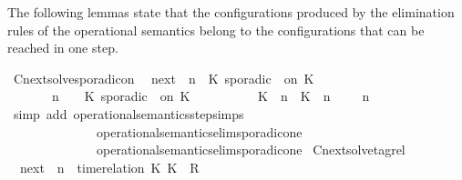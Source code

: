\begin{isabellebody}
\endisatagproof
{\isafoldproof}%
%
\isadelimproof
%
\endisadelimproof
%
\begin{isamarkuptext}%
The following lemmas state that the configurations produced by the elimination 
  rules of the operational semantics belong to the configurations that can be 
  reached in one step.%
\end{isamarkuptext}\isamarkuptrue%
\isamarkupfalse%
\ Cnext{\isacharunderscore}solve{\isacharunderscore}sporadicon{\isacharcolon}\isanewline
\ \ {\isacartoucheopen}{\isacharparenleft}{\isasymC}\isactrlsub n\isactrlsub e\isactrlsub x\isactrlsub t\ {\isacharparenleft}{\isasymGamma}{\isacharcomma}\ n\ {\isasymturnstile}\ {\isacharparenleft}{\isacharparenleft}K\ sporadic\ {\isasymtau}\ on\ K\ {\isacharhash}\ {\isasymPsi}{\isacharparenright}\ {\isasymtriangleright}\ {\isasymPhi}{\isacharparenright}{\isacharparenright}\isanewline
\ \ \ \ {\isasymsupseteq}\ {\isacharbraceleft}\ {\isasymGamma}{\isacharcomma}\ n\ {\isasymturnstile}\ {\isasymPsi}\ {\isasymtriangleright}\ {\isacharparenleft}{\isacharparenleft}K\ sporadic\ {\isasymtau}\ on\ K\ {\isacharhash}\ {\isasymPhi}{\isacharparenright}{\isacharcomma}\isanewline
\ \ \ \ \ \ \ \ {\isacharparenleft}{\isacharparenleft}K\ {\isasymUp}\ n{\isacharparenright}\ {\isacharhash}\ {\isacharparenleft}K\ {\isasymDown}\ n\ {\isacharat}\ {\isasymtau}{\isacharparenright}\ {\isacharhash}\ {\isasymGamma}{\isacharparenright}{\isacharcomma}\ n\ {\isasymturnstile}\ {\isasymPsi}\ {\isasymtriangleright}\ {\isasymPhi}\ {\isacharbraceright}{\isacartoucheclose}\isanewline
%
\isadelimproof
%
\endisadelimproof
%
\isatagproof
{}\isamarkupfalse%
\ {\isacharparenleft}simp\ add{\isacharcolon}\ operational{\isacharunderscore}semantics{\isacharunderscore}step{\isachardot}simps\isanewline
\ \ \ \ \ \ \ \ \ \ \ \ \ \ operational{\isacharunderscore}semantics{\isacharunderscore}elim{\isachardot}sporadic{\isacharunderscore}on{\isacharunderscore}e{}\isanewline
\ \ \ \ \ \ \ \ \ \ \ \ \ \ operational{\isacharunderscore}semantics{\isacharunderscore}elim{\isachardot}sporadic{\isacharunderscore}on{\isacharunderscore}e{}{\isacharparenright}%
\endisatagproof
{\isafoldproof}%
%
\isadelimproof
\isanewline
%
\endisadelimproof
\isanewline
{}\isamarkupfalse%
\ Cnext{\isacharunderscore}solve{\isacharunderscore}tagrel{\isacharcolon}\isanewline
\ \ {\isacartoucheopen}{\isacharparenleft}{\isasymC}\isactrlsub n\isactrlsub e\isactrlsub x\isactrlsub t\ {\isacharparenleft}{\isasymGamma}{\isacharcomma}\ n\ {\isasymturnstile}\ {\isacharparenleft}{\isacharparenleft}time{\isacharminus}relation\ {\isasymlfloor}K\ K\ {\isasymin}\ R{\isacharparenright}\ {\isacharhash}\ {\isasymPsi}{\isacharparenright}\ {\isasymtriangleright}\ {\isasymPhi}{\isacharparenright}{\isacharparenright}\isanewline

\end{isabellebody}
